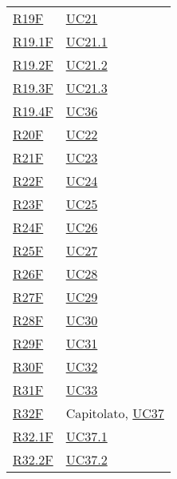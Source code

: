 \begin{center}
\begin{longtable}[!h]{p{50px} p{50px}}
        \hyperref[tab:RequisitiFunzionali]{R19F}   & \hyperref[sec:UC21]{UC21}                      \\
        \hyperref[tab:RequisitiFunzionali]{R19.1F} & \hyperref[sec:UC21.1]{UC21.1}                  \\
        \hyperref[tab:RequisitiFunzionali]{R19.2F} & \hyperref[sec:UC21.2]{UC21.2}                  \\
        \hyperref[tab:RequisitiFunzionali]{R19.3F} & \hyperref[sec:UC21.3]{UC21.3}                  \\
        \hyperref[tab:RequisitiFunzionali]{R19.4F} & \hyperref[sec:UC36]{UC36}                      \\
        \hyperref[tab:RequisitiFunzionali]{R20F}   & \hyperref[sec:UC22]{UC22}                      \\
        \hyperref[tab:RequisitiFunzionali]{R21F}   & \hyperref[sec:UC23]{UC23}                      \\
        \hyperref[tab:RequisitiFunzionali]{R22F}   & \hyperref[sec:UC24]{UC24}                      \\
        \hyperref[tab:RequisitiFunzionali]{R23F}   & \hyperref[sec:UC25]{UC25}                      \\
        \hyperref[tab:RequisitiFunzionali]{R24F}   & \hyperref[sec:UC26]{UC26}                      \\
        \hyperref[tab:RequisitiFunzionali]{R25F}   & \hyperref[sec:UC27]{UC27}                      \\
        \hyperref[tab:RequisitiFunzionali]{R26F}   & \hyperref[sec:UC28]{UC28}                      \\
        \hyperref[tab:RequisitiFunzionali]{R27F}   & \hyperref[sec:UC29]{UC29}                      \\
        \hyperref[tab:RequisitiFunzionali]{R28F}   & \hyperref[sec:UC30]{UC30}                      \\
        \hyperref[tab:RequisitiFunzionali]{R29F}   & \hyperref[sec:UC31]{UC31}                      \\
        \hyperref[tab:RequisitiFunzionali]{R30F}   & \hyperref[sec:UC32]{UC32}                      \\
        \hyperref[tab:RequisitiFunzionali]{R31F}   & \hyperref[sec:UC33]{UC33}                      \\
        \hyperref[tab:RequisitiFunzionali]{R32F}   & Capitolato, \hyperref[sec:UC37]{UC37}                                    \\
        \hyperref[tab:RequisitiFunzionali]{R32.1F} & \hyperref[sec:UC37.1]{UC37.1}                  \\
        \hyperref[tab:RequisitiFunzionali]{R32.2F} & \hyperref[sec:UC37.2]{UC37.2}                  \\




\end{longtable}
\end{center}
